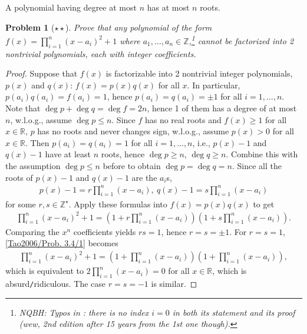 \documentclass[oneside]{book}
\numberwithin{equation}{section}
\newtheorem{problem}{Problem}[section]
\begin{document}
A polynomial having degree at most $n$ has at most $n$ roots.
\begin{problem}[$\star\star$]
	Prove that any polynomial of the form $f(x) = \prod_{i=1}^n (x - a_i)^2 + 1$ where $a_1,\ldots,a_n\in\mathbb{Z}$,\footnote{NQBH: Typos in \cite[Problem. 3.4, p. 45.]{Tao2006}: there is no index $i = 0$ in both its statement and its proof (wew,  2nd edition after 15 years from the 1st one though).} cannot be factorized into 2 nontrivial polynomials, each with integer coefficients.
\end{problem}

\begin{proof}[Proof]
	Suppose that $f(x)$ is factorizable into 2 nontrivial integer polynomials, $p(x)$ and $q(x)$: $f(x) = p(x)q(x)$ for all $x$. In particular, $p(a_i)q(a_i) = f(a_i) = 1$, hence $p(a_i) = q(a_i) = \pm1$ for all $i = 1,\ldots,n$. Note that $\deg p + \deg q = \deg f = 2n$, hence 1 of them has a degree of at most $n$, w.l.o.g., assume $\deg p\le n$. Since $f$ has no real roots and $f(x)\ge 1$ for all $x\in\mathbb{R}$, $p$ has no roots and never changes sign, w.l.o.g., assume $p(x) > 0$ for all $x\in\mathbb{R}$. Then $p(a_i) = q(a_i) = 1$ for all $i = 1,\ldots,n$, i.e., $p(x) - 1$ and $q(x) - 1$ have at least $n$ roots, hence $\deg p\ge n$, $\deg q\ge n$. Combine this with the assumption $\deg p\le n$ before to obtain $\deg p = \deg q = n$. Since all the roots of $p(x) - 1$ and $q(x) - 1$ are the $a_i$s,
	\begin{align*}
		p(x) - 1 = r\prod_{i=1}^n (x - a_i),\ q(x) - 1 = s\prod_{i=1}^n (x - a_i)
	\end{align*}
	for some $r,s\in\mathbb{Z}^\star$. Apply these formulas into $f(x) = p(x)q(x)$ to get
	\begin{align}
		\label{Tao2006/Prob. 3.4/1}
		\prod_{i=1}^n (x - a_i)^2 + 1 = \left(1 + r\prod_{i=1}^n (x - a_i)\right)\left(1 + s\prod_{i=1}^n (x - a_i)\right).
	\end{align}
	Comparing the $x^n$ coefficients yields $rs = 1$, hence $r = s = \pm 1$. For $r = s = 1$, \eqref{Tao2006/Prob. 3.4/1} becomes
	\begin{align}
		\label{Tao2006/Prob. 3.4/2}
		\prod_{i=1}^n (x - a_i)^2 + 1 = \left(1 + \prod_{i=1}^n (x - a_i)\right)\left(1 + \prod_{i=1}^n (x - a_i)\right),
	\end{align}
	which is equivalent to $2\prod_{i=1}^n (x - a_i) = 0$ for all $x\in\mathbb{R}$, which is absurd\texttt{/}ridiculous. The case $r = s = -1$ is similar. 
\end{proof}
\end{document}
